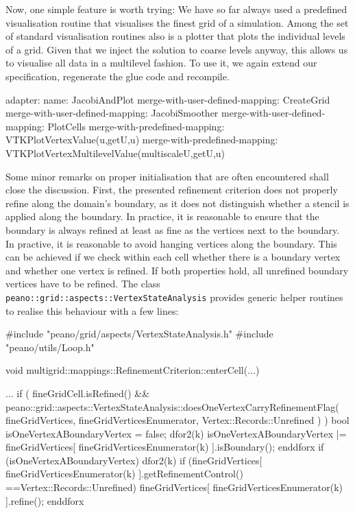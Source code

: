 Now, one simple feature is worth trying: We have so far always used a
predefined visualisation routine that visualises the finest grid of a
simulation.
Among the set of standard visualisation routines also is a plotter that plots
the individual levels of a grid.
Given that we inject the solution to coarse levels anyway, this allows us to
visualise all data in a multilevel fashion.
To use it, we again extend our specification, regenerate the glue code and
recompile.

\begin{code}
adapter:
  name: JacobiAndPlot
  merge-with-user-defined-mapping: CreateGrid
  merge-with-user-defined-mapping: JacobiSmoother
  merge-with-user-defined-mapping: PlotCells
  merge-with-predefined-mapping: VTKPlotVertexValue(u,getU,u)
  merge-with-predefined-mapping: VTKPlotVertexMultilevelValue(multiscaleU,getU,u)
\end{code}

\noindent
Some minor remarks on proper initialisation that are often encountered shall
close the discussion.
First, the presented refinement criterion does not properly refine along the
domain's boundary, as it does not distinguish whether a stencil is applied along
the boundary. 
In practice, it is reasonable to ensure that the boundary is always refined at
least as fine as the vertices next to the boundary. 
In practive, it is reasonable to avoid hanging vertices along the boundary. 
This can be achieved if we check within each cell whether there is a boundary
vertex and whether one vertex is refined.
If both properties hold, all unrefined boundary vertices have to be refined. 
The class \texttt{peano::grid::aspects::VertexStateAnalysis} provides generic
helper routines to realise this behaviour with a few lines:

\begin{code}
#include "peano/grid/aspects/VertexStateAnalysis.h"
#include "peano/utils/Loop.h"

void multigrid::mappings::RefinementCriterion::enterCell(...) {
  ...
  if (
    fineGridCell.isRefined()
    &&
    peano::grid::aspects::VertexStateAnalysis::doesOneVertexCarryRefinementFlag(
      fineGridVertices, fineGridVerticesEnumerator, Vertex::Records::Unrefined
    )
  ) {
    bool isOneVertexABoundaryVertex = false;
    dfor2(k)
      isOneVertexABoundaryVertex |= 
        fineGridVertices[ fineGridVerticesEnumerator(k) ].isBoundary();
    enddforx
    if (isOneVertexABoundaryVertex) {
      dfor2(k)
        if (fineGridVertices[ fineGridVerticesEnumerator(k) ].getRefinementControl()
          ==Vertex::Records::Unrefined) {
          fineGridVertices[ fineGridVerticesEnumerator(k) ].refine();
        }
      enddforx
    }
  }
 
}
\end{code}

